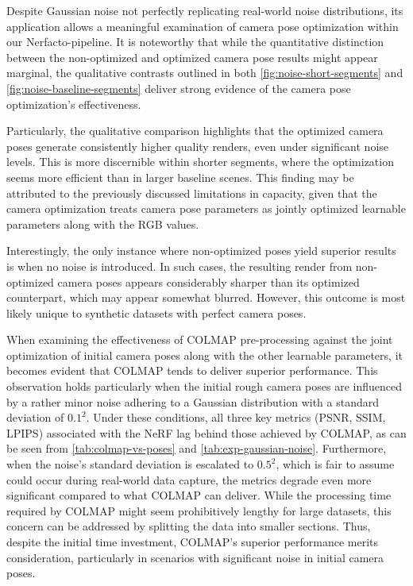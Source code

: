 Despite Gaussian noise not perfectly replicating real-world noise distributions, its application allows a meaningful examination of camera pose optimization within our Nerfacto-pipeline. It is noteworthy that while the quantitative distinction between the non-optimized and optimized camera pose results might appear marginal, the qualitative contrasts outlined in both \autoref{fig:noise-short-segments} and \autoref{fig:noise-baseline-segments} deliver strong evidence of the camera pose optimization's effectiveness.

Particularly, the qualitative comparison highlights that the optimized camera poses generate consistently higher quality renders, even under significant noise levels. This is more discernible within shorter segments, where the optimization seems more efficient than in larger baseline scenes. This finding may be attributed to the previously discussed limitations in capacity, given that the camera optimization treats camera pose parameters as jointly optimized learnable parameters along with the RGB values.

Interestingly, the only instance where non-optimized poses yield superior results is when no noise is introduced. In such cases, the resulting render from non-optimized camera poses appears considerably sharper than its optimized counterpart, which may appear somewhat blurred. However, this outcome is most likely unique to synthetic datasets with perfect camera poses.


When examining the effectiveness of COLMAP pre-processing against the joint optimization of initial camera poses along with the other learnable parameters, it becomes evident that COLMAP tends to deliver superior performance. This observation holds particularly when the initial rough camera poses are influenced by a rather minor noise adhering to a Gaussian distribution with a standard deviation of $0.1^2$. Under these conditions, all three key metrics (PSNR, SSIM, LPIPS) associated with the NeRF lag behind those achieved by COLMAP, as can be seen from \autoref{tab:colmap-vs-poses} and \autoref{tab:exp-gaussian-noise}. Furthermore, when the noise's standard deviation is escalated to $0.5^2$, which is fair to assume could occur during real-world data capture, the metrics degrade even more significant compared to what COLMAP can deliver. While the processing time required by COLMAP might seem prohibitively lengthy for large datasets, this concern can be addressed by splitting the data into smaller sections. Thus, despite the initial time investment, COLMAP's superior performance merits consideration, particularly in scenarios with significant noise in initial camera poses.

